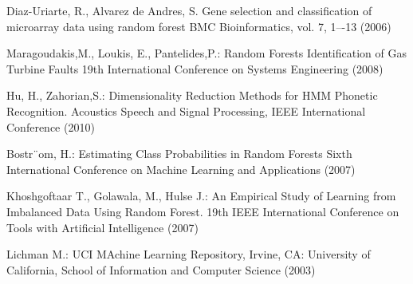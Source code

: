 \documentclass{llncs}
\begin{document}
\begin{thebibliography}{5}
Diaz-Uriarte, R., Alvarez de Andres, S.
Gene selection and classification of microarray data using random forest
BMC Bioinformatics, vol. 7, 1–-13 (2006)

Maragoudakis,M., Loukis, E., Pantelides,P.:
Random Forests Identification of Gas Turbine Faults
19th International Conference on Systems Engineering (2008)

Hu, H., Zahorian,S.:
Dimensionality Reduction Methods for HMM Phonetic Recognition.
Acoustics Speech and Signal Processing, IEEE International Conference (2010)

Bostr¨om, H.:
Estimating Class Probabilities in Random Forests
Sixth International Conference on Machine Learning and Applications (2007)

Khoshgoftaar T., Golawala, M., Hulse J.:
An Empirical Study of Learning from Imbalanced Data Using Random Forest.
19th IEEE International Conference on Tools with Artificial Intelligence (2007)

Lichman M.:
UCI MAchine Learning Repository, Irvine, CA: University of California, School of Information and Computer Science (2003)

\end{thebibliography}

\clearpage
{}
\renewcommand{\indexname}{Author Index}
\printindex
\clearpage
\end{document}
